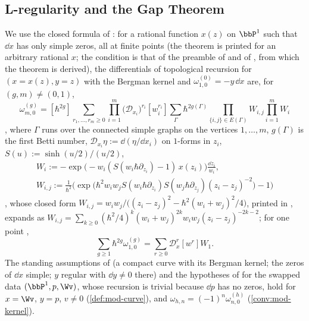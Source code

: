 \subsection{L-regularity and the Gap Theorem}
\label{sec:mod-Lreg}

We use the closed formula of \cite[Thm.~7.1]{ABDKS25}: for a rational function $x(z)$ on $\bbP^1$ such that $\dd x$ has only simple zeros, all at finite points (the theorem is printed for an arbitrary rational $x$; the condition is that of the preamble of \cite[\S7.1]{ABDKS25} and of \cite[Theorem~1.14]{ABDKS25}, from which the theorem is derived), the differentials of topological recursion for $(x=x(z),y=z)$ with the Bergman kernel and $\omega^{(0)}_{1,0}=-y\,\dd x$ are, for $(g,m)\neq(0,1)$,
\begin{equation}
\label{eq:mod-abdks}
\omega^{(g)}_{m,0}=[\hbar^{2g}]\sum_{r_1,\dots,r_m\geq 0}\prod_{i=1}^m\big(\mathcal D_{x_i}\big)^{r_i}[w_i^{r_i}]\sum_{\Gamma}\hbar^{2g(\Gamma)}\prod_{\{i,j\}\in E(\Gamma)}W_{i,j}\prod_{i=1}^mW_i
\end{equation}
\cite[(7.9)]{ABDKS25}, where $\Gamma$ runs over the connected simple graphs on the vertices $1,\dots,m$, $g(\Gamma)$ is the first Betti number, $\mathcal D_{x_i}\eta:=\dd(\eta/\dd x_i)$ on $1$-forms in $z_i$, $S(u):=\sinh(u/2)/(u/2)$,
\begin{gather*}
W_i:=-\exp\!\big(-w_i(S(w_i\hbar\partial_{z_i})-1)\,x(z_i)\big)\frac{\dd z_i}{w_i},\\
W_{i,j}:=\frac{1}{\hbar^2}\Big(\exp\!\big(\hbar^2w_iw_jS(w_i\hbar\partial_{z_i})S(w_j\hbar\partial_{z_j})(z_i-z_j)^{-2}\big)-1\Big)
\end{gather*}
\cite[(7.6), (7.7)]{ABDKS25}, whose closed form $W_{i,j}=w_iw_j\big/\bigl((z_i-z_j)^2-\hbar^2(w_i+w_j)^2/4\bigr)$, printed in \cite[(7.7)]{ABDKS25}, expands as $W_{i,j}=\sum_{k\geq 0}(\hbar^2/4)^k(w_i+w_j)^{2k}w_iw_j(z_i-z_j)^{-2k-2}$; for one point \cite[(7.10)]{ABDKS25},
\begin{equation}
\label{eq:mod-710}
\sum_{g\geq 1}\hbar^{2g}\omega^{(g)}_{1,0}=\sum_{r\geq 0}\mathcal D_x^r[w^r]W_1 .
\end{equation}
The standing assumptions of \cite[\S1.1]{ABDKS25} (a compact curve with its Bergman kernel; the zeros of $\dd x$ simple; $y$ regular with $\dd y\neq0$ there) and the hypotheses of \cite[Theorem~1.14]{ABDKS25} for the swapped data $(\bbP^1,p,\Wv)$, whose recursion is trivial because $\dd p$ has no zeros, hold for $x=\Wv$, $y=p$, $v\neq 0$ (\cref{def:mod-curve}), and $\omega_{h,n}=(-1)^n\omega^{(h)}_{n,0}$ (\cref{conv:mod-kernel}).

